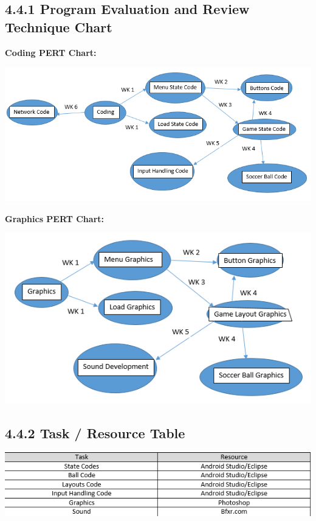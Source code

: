 \documentclass{article}
\begin{document}
\subsection{4.4.1 Program Evaluation and Review Technique Chart}
\bf{Coding PERT Chart:}
\begin{center}
\includegraphics[width=145mm]{Code PERT.png}
\end{center}

\bf{Graphics PERT Chart:}
\begin{center}
\includegraphics[width=140mm]{Graphics PERT.png}
\end{center}


\subsection{4.4.2 Task / Resource Table}

\begin{center}
\includegraphics[width=140mm]{Tasks vs Resources.png}
\end{center}
\end{document}
